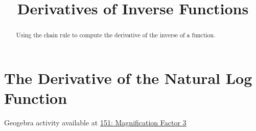 \documentclass{ximera}
\title{Derivatives of Inverse Functions}
\begin{document}
\begin{abstract}
Using the chain rule to compute the derivative of the inverse of a function.
\end{abstract}
\maketitle

\section*{The Derivative of the Natural Log Function}

\begin{example}   \label{Ex:LDfjbbrt}

\begin{onlineOnly}
    \begin{center}
\end{center}
\end{onlineOnly}

Geogebra activity available at \href{https://www.desmos.com/calculator/t3x7sdfast}{151: Magnification Factor 3}

\end{example}
\end{document}
